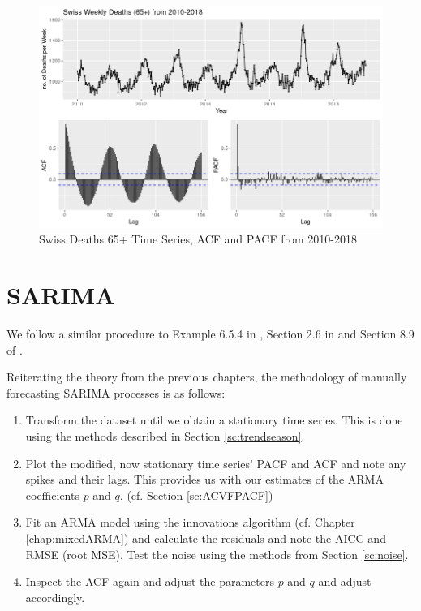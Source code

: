 \documentclass[a4paper, oneside]{discothesis}
\begin{document}
\begin{figure}[H]
\centering
\includegraphics[width=.8\textwidth]{figures/ts_10_18.png}
\caption{Swiss Deaths 65+ Time Series, ACF and PACF from 2010-2018 \cite{deaths_2010-2019}}
\label{fig:ts_10_18}
\end{figure}


\section{SARIMA}
We follow a similar procedure to Example 6.5.4 in \cite{itsf}, Section 2.6 in \cite{little_ts} and Section 8.9 of \cite{fpp2}.

Reiterating the theory from the previous chapters, the methodology of manually forecasting SARIMA processes is as follows:
\begin{enumerate}
    \item Transform the dataset until we obtain a stationary time series. This is done using the methods described in Section \ref{sc:trendseason}.
    \item Plot the modified, now stationary time series' PACF and ACF and note any spikes and their lags. This provides us with our estimates of the ARMA coefficients $p$ and $q$. (cf. Section \ref{sc:ACVFPACF})
    \item Fit an ARMA model using the innovations algorithm (cf. Chapter \ref{chap:mixedARMA}) and calculate the residuals and note the AICC and RMSE (root MSE). Test the noise using the methods from Section \ref{sc:noise}.
    \item Inspect the ACF again and adjust the parameters $p$ and $q$ and adjust accordingly.
\end{enumerate}
\end{document}
